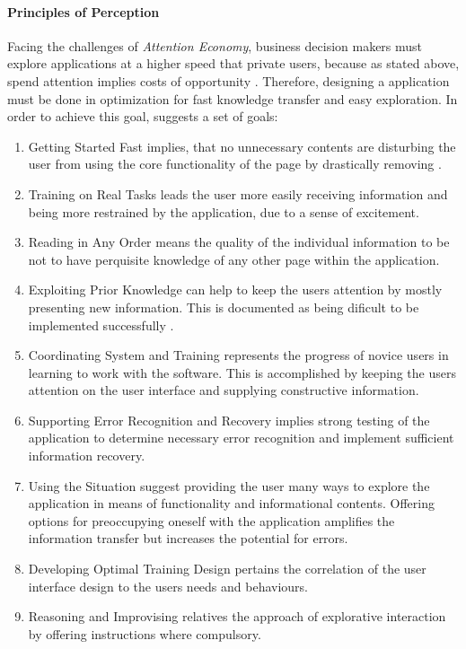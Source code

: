 \paragraph{Principles of Perception}
Facing the challenges of \textit{Attention Economy}, business decision makers must explore applications at a higher speed that private users, because as stated above, spend attention implies costs of opportunity \parencite[cf.][]{Bakar.2017}. Therefore, designing a application must be done in optimization for fast knowledge transfer and easy exploration. In order to achieve this goal, \textcite{Bakar.2017} suggests a set of goals:
\begin{enumerate}
\item{Getting Started Fast} implies, that no unnecessary contents are disturbing the user from using the core functionality of the page by drastically removing   \parencite{Bakar.2017}.
\item{Training on Real Tasks} leads the user more easily receiving information and being more restrained by the application, due to a sense of excitement.
\item{Reading in Any Order} means the quality of the individual information to be not to have perquisite knowledge of any other page within the application.
\item{Exploiting Prior Knowledge} can help to keep the users attention by mostly presenting new information. This is documented as being dificult to be implemented successfully .
\item{Coordinating System and Training} represents the progress of novice users in learning to work with the software. This is accomplished by keeping the users attention on the user interface and supplying constructive information.
\item{Supporting Error Recognition and Recovery} implies strong testing of the application to determine necessary error recognition and implement sufficient information recovery.
\item{Using the Situation} suggest providing the user many ways to explore the application in means of functionality and informational contents. Offering options for preoccupying oneself with the application amplifies the information transfer but increases the potential for errors.
\item{Developing Optimal Training Design} pertains the correlation of the user interface design to the users needs and behaviours. 
\item{Reasoning and Improvising} relatives the approach of explorative interaction by offering instructions where compulsory.
\end{enumerate}

